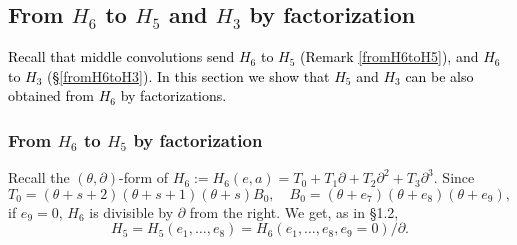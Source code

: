 \documentclass[a4paper,12pt]{article}
\theoremstyle{definition}
\theoremstyle{remark}
\numberwithin{equation}{section} %
\newcommand{\blue}[1]{\textcolor{black}{#1}}
\begin{document}
\subsection{From $H_6$ to $H_5$ and $H_3$ by factorization}\label{fromH6toH53byfac}%
\blue{Recall that middle convolutions send $H_6$ to $H_5$ (Remark \ref{fromH6toH5}), and $H_6$ to $H_3$ (\S \ref{fromH6toH3}). In this section we show that $H_5$ and $H_3$ can be also obtained from $H_6$ by factorizations.}
\subsubsection{From $H_6$ to $H_5$ by factorization}\label{G6G5}%
Recall the $(\theta,\partial)$-form of $H_6:=H_6(e,a)=T_0+T_1\partial+T_2\partial^2+T_3\partial^3$. Since
$$ T_0=(\theta+s+2)(\theta+s+1)(\theta+s)B_0,\quad B_0=(\theta+e_7)(\theta+e_8)(\theta+e_9),$$
if $e_9=0$,  $H_6$ is divisible  by $\partial$ from the right. We get, as in \S 1.2,
$$H_5=H_5(e_1,\dots,e_8)=H_6(e_1,\dots,e_8,e_9=0)/\partial.$$
\end{document}
